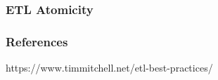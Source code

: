 \begin{frame}
	\frametitle{ETL Atomicity}

\end{frame}

\begin{frame}
	\frametitle{References}
	https://www.timmitchell.net/etl-best-practices/
\end{frame}





